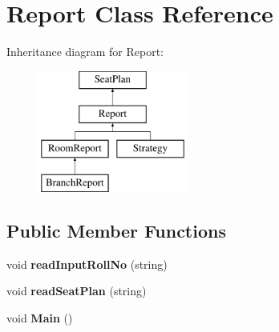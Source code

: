 \hypertarget{classReport}{\section{Report Class Reference}
\label{classReport}
}
Inheritance diagram for Report\-:\begin{figure}[H]
\begin{center}
\leavevmode
\includegraphics[height=4.000000cm]{classReport}
\end{center}
\end{figure}
\subsection*{Public Member Functions}
\begin{DoxyCompactItemize}
\item 
\hypertarget{classReport_a0755962d5d92467bbb390bf42779fd52}{void {\bfseries read\-Input\-Roll\-No} (string)}\label{classReport_a0755962d5d92467bbb390bf42779fd52}

\item 
\hypertarget{classReport_a0f6881a1deb2777b3ae19d0e7260870f}{void {\bfseries read\-Seat\-Plan} (string)}\label{classReport_a0f6881a1deb2777b3ae19d0e7260870f}

\item 
\hypertarget{classReport_a35895231f3a27c3247f9498cda2b42fe}{void {\bfseries Main} ()}\label{classReport_a35895231f3a27c3247f9498cda2b42fe}

\end{DoxyCompactItemize}
